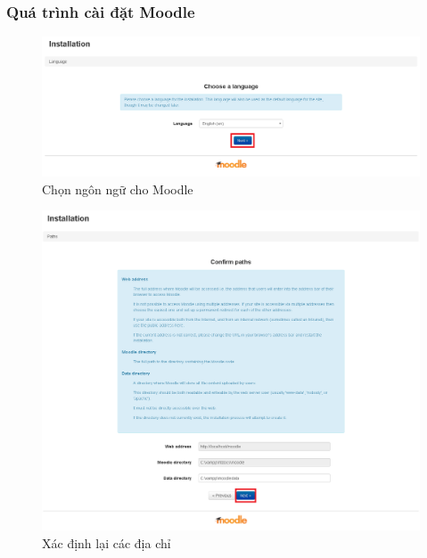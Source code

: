 \subsubsection*{Quá trình cài đặt Moodle}

\begin{center}
	\begin{figure}[htp]
		\begin{center}
			\includegraphics[width=1\linewidth]{img/choosenn}
		\end{center}
		\caption{Chọn ngôn ngữ cho Moodle}
		\label{refhinh30}
	\end{figure}
\end{center}

\begin{center}
	\begin{figure}[htp]
		\begin{center}
			\includegraphics[width=0.8\linewidth]{img/direct}
		\end{center}
		\caption{Xác định lại các địa chỉ}
		\label{refhinh31}
	\end{figure}
\end{center}

